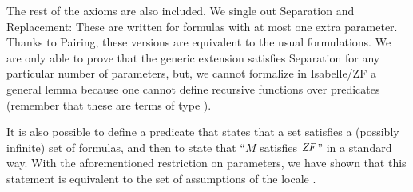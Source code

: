 The rest of the axioms are also included. We single out Separation and
Replacement: These are written for formulas with at most one extra
parameter. Thanks to Pairing, these versions are equivalent
to the usual formulations. We are only able to prove that the generic
extension satisfies Separation for any particular number of
parameters, but, we cannot formalize in Isabelle/ZF a general lemma
because one cannot define recursive functions over predicates
(remember that these are terms of type ).


It is also possible to define a predicate that states that a set
satisfies a (possibly infinite) set of formulas, and then to state
that ``$M$ satisfies $\mathit{ZF}$'' in a standard way. With the
aforementioned restriction on parameters, we have shown that this
statement is equivalent to the set of assumptions of the locale
.
%
